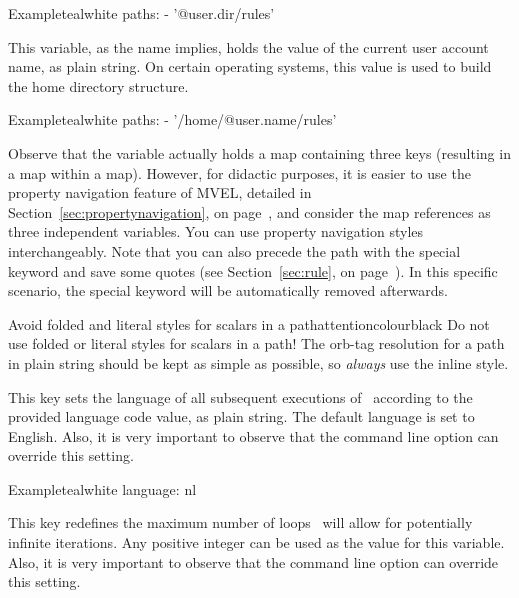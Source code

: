 \begin{description}
\begin{description}
\begin{codebox}{Example}{teal}{\icnote}{white}
paths:
- '@{user.dir}/rules'
\end{codebox}

\item[\varbox{user.name}] This variable, as the name implies, holds the value of the current user account name, as plain string. On certain operating systems, this value is used to build the home directory structure.
\end{description}

\begin{codebox}{Example}{teal}{\icnote}{white}
paths:
- '/home/@{user.name}/rules'
\end{codebox}

Observe that the  variable actually holds a map containing three keys (resulting in a map within a map). However, for didactic purposes, it is easier to use the property navigation feature of \gls{MVEL}, detailed in Section~\ref{sec:propertynavigation}, on page~\pageref{sec:propertynavigation}, and consider the map references as three independent variables. You can use property navigation styles interchangeably. Note that you can also precede the path with the special keyword  and save some quotes (see Section~\ref{sec:rule}, on page~\pageref{sec:rule}). In this specific scenario, the special keyword will be automatically removed afterwards.

\begin{messagebox}{Avoid folded and literal styles for scalars in a path}{attentioncolour}{\icattention}{black}
Do not use folded or literal styles for scalars in a path! The \gls{orb-tag} resolution for a path in plain string should be kept as simple as possible, so \emph{always} use the inline style.
\end{messagebox}

\item[\describecf{O}{string}{language}{en}] This key sets the language of all subsequent executions of \arara\ according to the provided language code value, as plain string. The default language is set to English. Also, it is very important to observe that the  command line option can override this setting.

\begin{codebox}{Example}{teal}{\icnote}{white}
language: nl
\end{codebox}

\item[\describecf{O}{integer}{loops}{10}] This key redefines the maximum number of loops \arara\ will allow for potentially infinite iterations. Any positive integer can be used as the value for this variable. Also, it is very important to observe that the  command line option can override this setting.


\end{description}
